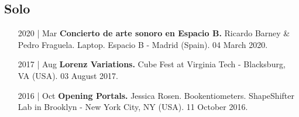 \documentclass[12pt]{article}%
\begin{document}
\subsection{Solo}%
\begin{itemize}[align=parleft,leftmargin=2.25cm,labelwidth=2cm]
\item[2020 | Mar]
\textbf{Concierto de arte sonoro en Espacio B.}
Ricardo Barney \& Pedro Fraguela. 
Laptop. 
Espacio B {-} Madrid (Spain). 
04 March 2020.
\end{itemize}%
\begin{itemize}[align=parleft,leftmargin=2.25cm,labelwidth=2cm]
\item[2017 | Aug]
\textbf{Lorenz Variations.}
Cube Fest at Virginia Tech {-} Blacksburg, VA (USA). 
03 August 2017.
\end{itemize}%
\begin{itemize}[align=parleft,leftmargin=2.25cm,labelwidth=2cm]
\item[2016 | Oct]
\textbf{Opening Portals.}
Jessica Rosen. 
Bookentiometers. 
ShapeShifter Lab in Brooklyn {-} New York City, NY (USA). 
11 October 2016.
\end{itemize}%
\end{document}
